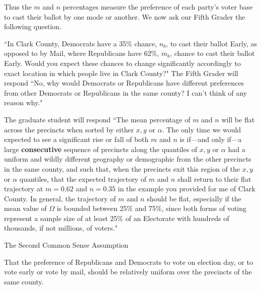 Thus the $m$ and $n$ percentages measure the preference of each party's voter base to cast their ballot by one mode or another. We now ask our Fifth Grader the following question.

``In Clark County, Democrats have a 35\% chance, $n_{b}$, to cast their ballot Early, as opposed to by Mail, where Republicans have 62\%, $m_{b}$, chance to cast their ballot Early. Would you expect these chances to change significantly accordingly to exact location in which people live in Clark County?" The Fifth Grader will respond ``No, why would Democrats or Republicans have different preferences from other Democrats or Republicans in the same county? I can't think of any reason why."

The graduate student will respond ``The mean percentage of $m$ and $n$ will be flat across the precincts when sorted by either $x,y$ or $\alpha$. The only time we would expected to see a significant rise or fall of both $m$ and $n$ is if---and only if---a large \textbf{consecutive} sequence of precincts along the quantiles of $x,y$ or $\alpha$ had a uniform and wildly different geography or demographic from the other precincts in the same county, and such that, when the precincts exit this region of the $x,y$ or $\alpha$ quantiles, that the expected trajectory of $m$ and $n$ shall return to their flat trajectory at $m=0.62$ and $n=0.35$ in the example you provided for me of Clark County. In general, the trajectory of $m$ and $n$ should be flat, especially if the mean value of $\Omega$ is bounded between 25\% and 75\%, since both forms of voting represent a sample size of at least 25\% of an Electorate with hundreds of thousands, if not millions, of voters."

\begin{definition}{The Second Common Sense Assumption}

That the preference of Republicans and Democrats to vote on election day, or to vote early or vote by mail, should be relatively uniform over the precincts of the same county.
\end{definition}

